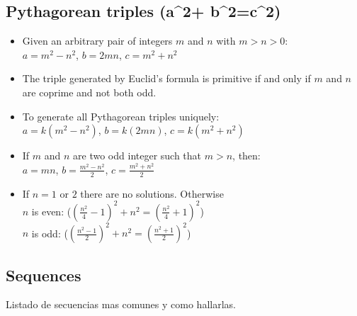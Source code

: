 \documentclass[10pt,letterpaper,twocolumn,twosided]{article}
\begin{document}
\subsection{Pythagorean triples (a^2+ b^2=c^2)}
\begin{itemize}
\item Given an arbitrary pair of integers $m$ and $n$ with $m > n > 0$:\\
$a = m^2 - n^2$, $b = 2mn$, $c = m^2 + n^2$
\item The triple generated by Euclid's formula is primitive if and only if $m$ and $n$ are coprime and not both odd.
\item To generate all Pythagorean triples uniquely:\\
$a = k (m^2 - n^2)$, $b = k(2mn)$, $c = k(m^2 + n^2)$
\item If $m$ and $n$ are two odd integer such that $m > n$, then:\\
$a = mn$, $b = \frac{m^2 - n^2}{2}$, $c = \frac{m^2 + n^2}{2}$
\item If $n=1$ or $2$ there are no solutions. Otherwise\\
$n$ is even: ($(\frac{n^2}{4} - 1)^2 + n^2 = (\frac{n^2}{4} + 1)^2$)\\
$n$ is odd: ($(\frac{n^2 - 1}{2})^2 + n^2 = (\frac{n^2 + 1}{2})^2$)
\end{itemize}


\subsection{Sequences}
Listado de secuencias mas comunes y como hallarlas.
\end{document}
